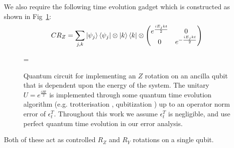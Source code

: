 \documentclass[aps,floatfix,10pt,amssymb,amsfont,amsmath,superscriptaddress,float,nofootinbib,longbibliography,nobalancelastpage,twocolumn]{revtex4-2}
\begin{document}
We also require the following time evolution gadget which is constructed as shown in Fig~\ref{fig:CRZ}:
\begin{equation}
    CR_Z =\sum_{j,k}\ket{\psi_j}\bra{\psi_j}\otimes\ket{k}\bra{k} \otimes \begin{pmatrix}
        e^{\frac{iE_jkt}{2}}&0\\
        0 & e^{-\frac{iE_jkt}{2}}
    \end{pmatrix}
\end{equation}
\begin{figure}
=
\caption{Quantum circuit for implementing an $Z$ rotation on an ancilla qubit that is dependent upon the energy of the system. The unitary $U=e^{\frac{iHt}{2}}$ is implemented through some quantum time evolution algorithm (e.g. trotterisation \cite{lloyd1996universal}, qubitization \cite{Low2019hamiltonian}) up to an operator norm error of $\epsilon^T_t$. Throughout this work we assume  $\epsilon^T_t$ is negligible, and use perfect quantum time evolution in our error analysis.}
    \label{fig:CRZ}
\end{figure}
Both of these act as controlled $R_Z$ and $R_Y$ rotations on a single qubit. 
\end{document}
